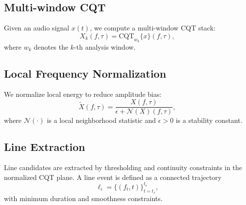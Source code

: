 \documentclass[11pt]{article}
\begin{document}













\subsection{Multi-window CQT}
Given an audio signal $x(t)$, we compute a multi-window CQT stack:
\begin{equation}
X_k(f,\tau) = \mathrm{CQT}_{w_k}\{x\}(f,\tau),
\end{equation}
where $w_k$ denotes the $k$-th analysis window.

\subsection{Local Frequency Normalization}
We normalize local energy to reduce amplitude bias:
\begin{equation}
\tilde{X}(f,\tau) = \frac{X(f,\tau)}{\epsilon + \mathcal{N}(X)(f,\tau)},
\end{equation}
where $\mathcal{N}(\cdot)$ is a local neighborhood statistic and $\epsilon>0$ is a stability constant.

\subsection{Line Extraction}
Line candidates are extracted by thresholding and continuity constraints in the normalized CQT plane. A line event is defined as a connected trajectory
\begin{equation}
\ell_i = \{(f_t, t)\}_{t=t_s}^{t_e},
\end{equation}
with minimum duration and smoothness constraints.
\end{document}
